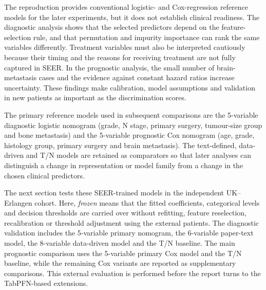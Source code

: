The reproduction provides conventional logistic- and Cox-regression reference
models for the later experiments, but it does not establish clinical readiness.
The diagnostic analysis shows that the selected predictors depend on the feature-
selection rule, and that permutation and impurity importance can rank the same
variables differently. Treatment variables must also be interpreted cautiously
because their timing and the reasons for receiving treatment are not fully captured
in SEER. In the prognostic analysis, the small number of brain-metastasis cases and
the evidence against constant hazard ratios increase uncertainty. These findings
make calibration, model assumptions and validation in new patients as important as
the discrimination scores.

The primary reference models used in subsequent comparisons are the 5-variable
diagnostic logistic nomogram (grade, N stage, primary surgery, tumour-size group
and bone metastasis) and the 5-variable prognostic Cox nomogram (age, grade,
histology group, primary surgery and brain metastasis). The text-defined,
data-driven and T/N models are retained as comparators so that later analyses can
distinguish a change in representation or model family from a change in the chosen
clinical predictors.

The next section tests these SEER-trained models in the independent UK--Erlangen
cohort. Here, \emph{frozen} means that the fitted coefficients, categorical levels
and decision thresholds are carried over without refitting, feature reselection,
recalibration or threshold adjustment using the external patients. The diagnostic
validation includes the 5-variable primary nomogram, the 6-variable paper-text
model, the 8-variable data-driven model and the T/N baseline. The main prognostic
comparison uses the 5-variable primary Cox model and the T/N baseline, while the
remaining Cox variants are reported as supplementary comparisons. This external
evaluation is performed before the report turns to the TabPFN-based extensions.
